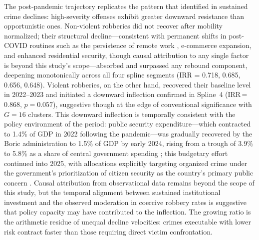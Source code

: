 \documentclass[pdflatex,sn-basic]{sn-jnl}
\begin{document}
The post-pandemic trajectory replicates the pattern that \citet{blumstein1988} identified in sustained crime declines: high-severity offenses exhibit greater downward resistance than opportunistic ones. Non-violent robberies did not recover after mobility normalized; their structural decline---consistent with permanent shifts in post-COVID routines such as the persistence of remote work \citep{seyidoglu2024}, e-commerce expansion, and enhanced residential security, though causal attribution to any single factor is beyond this study's scope---absorbed and surpassed any rebound component, deepening monotonically across all four spline segments (IRR = 0.718, 0.685, 0.656, 0.648). Violent robberies, on the other hand, recovered their baseline level in 2022--2023 and initiated a downward inflection confirmed in Spline~4 (IRR\,=\,0.868, $p=0.057$), suggestive though at the edge of conventional significance with $G=16$ clusters. This downward inflection is temporally consistent with the policy environment of the period: public security expenditure---which contracted to 1.4\% of GDP in 2022 following the pandemic---was gradually recovered by the Boric administration to 1.5\% of GDP by early 2024, rising from a trough of 3.9\% to 5.8\% as a share of central government spending \citep{dominguez2023gasto}; this budgetary effort continued into 2025, with allocations explicitly targeting organized crime under the government's prioritization of citizen security as the country's primary public concern \citep{diaz2024presupuesto}. Causal attribution from observational data remains beyond the scope of this study, but the temporal alignment between sustained institutional investment and the observed moderation in coercive robbery rates is suggestive that policy capacity may have contributed to the inflection. The growing ratio is the arithmetic residue of unequal decline velocities: crimes executable with lower risk contract faster than those requiring direct victim confrontation.
\end{document}
